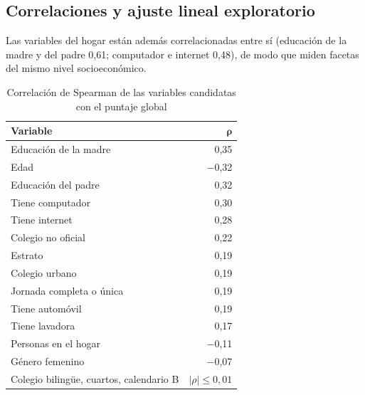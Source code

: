     \subsection{Correlaciones y ajuste lineal exploratorio}
        Las variables del hogar están además correlacionadas entre sí (educación de 
        la madre y del padre 0,61; computador e internet 0,48), de modo que miden 
        facetas del mismo nivel socioeconómico.

        \begin{table}[H]
            \centering
            \caption{Correlación de Spearman de las variables candidatas con el puntaje global}
            \label{spearman_table}
            \begin{tabular}{|l|r|}
                \hline
                \textbf{Variable} & $\boldsymbol{\rho}$ \\
                \hline
                Educación de la madre & 0,35 \\
                \hline
                Edad & $-$0,32 \\
                \hline
                Educación del padre & 0,32 \\
                \hline
                Tiene computador & 0,30 \\
                \hline
                Tiene internet & 0,28 \\
                \hline
                Colegio no oficial & 0,22 \\
                \hline
                Estrato & 0,19 \\
                \hline
                Colegio urbano & 0,19 \\
                \hline
                Jornada completa o única & 0,19 \\
                \hline
                Tiene automóvil & 0,19 \\
                \hline
                Tiene lavadora & 0,17 \\
                \hline
                Personas en el hogar & $-$0,11 \\
                \hline
                Género femenino & $-$0,07 \\
                \hline
                Colegio bilingüe, cuartos, calendario B & $|\rho| \le 0{,}01$ \\
                \hline
            \end{tabular}
        \end{table}

